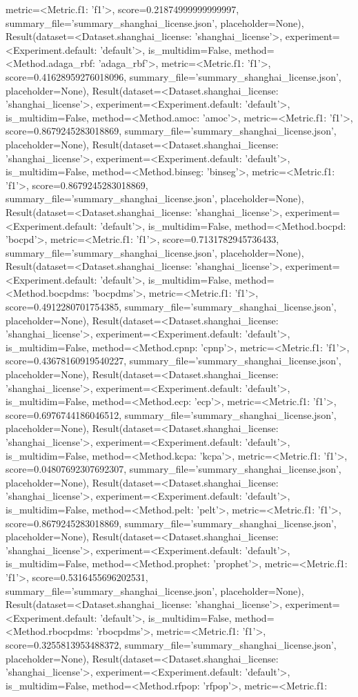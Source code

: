metric=<Metric.f1: 'f1'>, score=0.21874999999999997, summary_file='summary_shanghai_license.json', placeholder=None), Result(dataset=<Dataset.shanghai_license: 'shanghai_license'>, experiment=<Experiment.default: 'default'>, is_multidim=False, method=<Method.adaga_rbf: 'adaga_rbf'>, metric=<Metric.f1: 'f1'>, score=0.41628959276018096, summary_file='summary_shanghai_license.json', placeholder=None), Result(dataset=<Dataset.shanghai_license: 'shanghai_license'>, experiment=<Experiment.default: 'default'>, is_multidim=False, method=<Method.amoc: 'amoc'>, metric=<Metric.f1: 'f1'>, score=0.8679245283018869, summary_file='summary_shanghai_license.json', placeholder=None), Result(dataset=<Dataset.shanghai_license: 'shanghai_license'>, experiment=<Experiment.default: 'default'>, is_multidim=False, method=<Method.binseg: 'binseg'>, metric=<Metric.f1: 'f1'>, score=0.8679245283018869, summary_file='summary_shanghai_license.json', placeholder=None), Result(dataset=<Dataset.shanghai_license: 'shanghai_license'>, experiment=<Experiment.default: 'default'>, is_multidim=False, method=<Method.bocpd: 'bocpd'>, metric=<Metric.f1: 'f1'>, score=0.7131782945736433, summary_file='summary_shanghai_license.json', placeholder=None), Result(dataset=<Dataset.shanghai_license: 'shanghai_license'>, experiment=<Experiment.default: 'default'>, is_multidim=False, method=<Method.bocpdms: 'bocpdms'>, metric=<Metric.f1: 'f1'>, score=0.4912280701754385, summary_file='summary_shanghai_license.json', placeholder=None), Result(dataset=<Dataset.shanghai_license: 'shanghai_license'>, experiment=<Experiment.default: 'default'>, is_multidim=False, method=<Method.cpnp: 'cpnp'>, metric=<Metric.f1: 'f1'>, score=0.43678160919540227, summary_file='summary_shanghai_license.json', placeholder=None), Result(dataset=<Dataset.shanghai_license: 'shanghai_license'>, experiment=<Experiment.default: 'default'>, is_multidim=False, method=<Method.ecp: 'ecp'>, metric=<Metric.f1: 'f1'>, score=0.6976744186046512, summary_file='summary_shanghai_license.json', placeholder=None), Result(dataset=<Dataset.shanghai_license: 'shanghai_license'>, experiment=<Experiment.default: 'default'>, is_multidim=False, method=<Method.kcpa: 'kcpa'>, metric=<Metric.f1: 'f1'>, score=0.04807692307692307, summary_file='summary_shanghai_license.json', placeholder=None), Result(dataset=<Dataset.shanghai_license: 'shanghai_license'>, experiment=<Experiment.default: 'default'>, is_multidim=False, method=<Method.pelt: 'pelt'>, metric=<Metric.f1: 'f1'>, score=0.8679245283018869, summary_file='summary_shanghai_license.json', placeholder=None), Result(dataset=<Dataset.shanghai_license: 'shanghai_license'>, experiment=<Experiment.default: 'default'>, is_multidim=False, method=<Method.prophet: 'prophet'>, metric=<Metric.f1: 'f1'>, score=0.5316455696202531, summary_file='summary_shanghai_license.json', placeholder=None), Result(dataset=<Dataset.shanghai_license: 'shanghai_license'>, experiment=<Experiment.default: 'default'>, is_multidim=False, method=<Method.rbocpdms: 'rbocpdms'>, metric=<Metric.f1: 'f1'>, score=0.3255813953488372, summary_file='summary_shanghai_license.json', placeholder=None), Result(dataset=<Dataset.shanghai_license: 'shanghai_license'>, experiment=<Experiment.default: 'default'>, is_multidim=False, method=<Method.rfpop: 'rfpop'>, metric=<Metric.f1: 